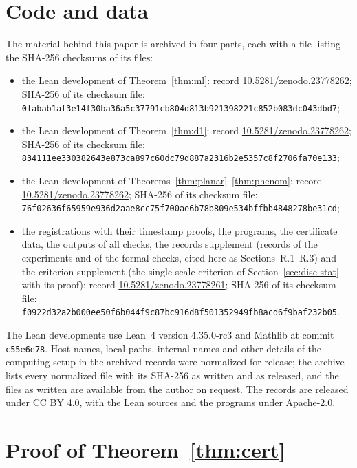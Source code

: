 \documentclass[11pt]{amsart}
\theoremstyle{definition}
\theoremstyle{remark}
\numberwithin{equation}{section}
\begin{document}
\section*{Code and data}
The material behind this paper is archived in four parts, each with a file listing the SHA-256 checksums of its files:
\begin{itemize}[leftmargin=2em]
\item the Lean development of Theorem~\ref{thm:ml}: record \href{https://doi.org/10.5281/zenodo.23778262}{10.5281/zenodo.23778262}; SHA-256 of its checksum file:\\ \texttt{0fabab1af3e14f30ba36a5c37791cb804d813b921398221c852b083dc043dbd7};
\item the Lean development of Theorem~\ref{thm:d1}: record \href{https://doi.org/10.5281/zenodo.23778262}{10.5281/zenodo.23778262}; SHA-256 of its checksum file:\\ \texttt{834111ee330382643e873ca897c60dc79d887a2316b2e5357c8f2706fa70e133};
\item the Lean development of Theorems~\ref{thm:planar}--\ref{thm:phenom}: record \href{https://doi.org/10.5281/zenodo.23778262}{10.5281/zenodo.23778262}; SHA-256 of its checksum file:\\ \texttt{76f02636f65959e936d2aae8cc75f700ae6b78b809e534bffbb4848278be31cd};
\item the registrations with their timestamp proofs, the programs, the certificate data, the outputs of all checks, the records supplement (records of the experiments and of the formal checks, cited here as Sections~R.1--R.3) and the criterion supplement (the single-scale criterion of Section~\ref{sec:disc-stat} with its proof): record \href{https://doi.org/10.5281/zenodo.23778261}{10.5281/zenodo.23778261}; SHA-256 of its checksum file:\\ \texttt{f0922d32a2b000ee50f6b044f9c87bc916d8f501352949fb8acd6f9baf232b05}.
\end{itemize}
The Lean developments use Lean~4 version 4.35.0-rc3 and Mathlib at commit \texttt{c55e6e78}. Host names, local paths, internal names and other details of the computing setup in the archived records were normalized for release; the archive lists every normalized file with its SHA-256 as written and as released, and the files as written are available from the author on request. The records are released under CC BY 4.0, with the Lean sources and the programs under Apache-2.0.

\appendix

\section{Proof of Theorem~\ref{thm:cert}}\label{app:proof}
\end{document}

